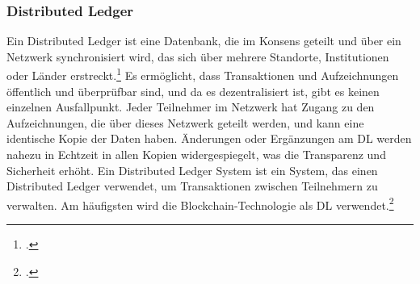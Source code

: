 \subsubsection{Distributed Ledger}
\label{sec:definition-distributed-ledger}
Ein Distributed Ledger ist eine Datenbank, die im Konsens geteilt und über ein Netzwerk synchronisiert wird, das sich über mehrere Standorte, Institutionen oder Länder erstreckt.\footcite[Vgl. hierzu und im Folgenden][]{w1,w2} 
Es ermöglicht, dass Transaktionen und Aufzeichnungen öffentlich und überprüfbar sind, und da es dezentralisiert ist, gibt es keinen einzelnen Ausfallpunkt. 
Jeder Teilnehmer im Netzwerk hat Zugang zu den Aufzeichnungen, die über dieses Netzwerk geteilt werden, und kann eine identische Kopie der Daten haben. Änderungen oder Ergänzungen am DL werden nahezu in Echtzeit in allen Kopien widergespiegelt, was die Transparenz und Sicherheit erhöht.
\bigbreak
\noindent
Ein Distributed Ledger System ist ein System, das einen Distributed Ledger verwendet, um Transaktionen zwischen Teilnehmern zu verwalten. Am häufigsten wird die Blockchain-Technologie als DL verwendet.\footcite[Vgl.][]{w3}